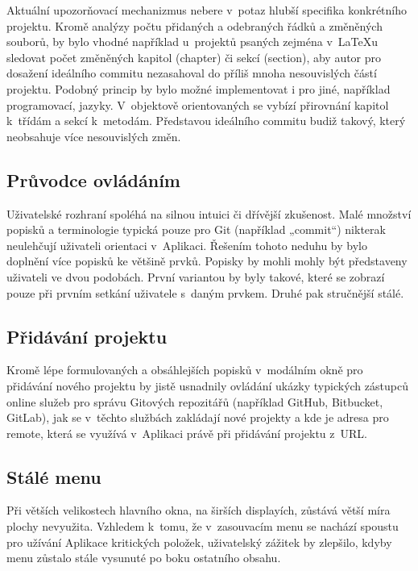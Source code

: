 Aktuální upozorňovací mechanizmus nebere v~potaz hlubší specifika konkrétního projektu. Kromě analýzy počtu přidaných a odebraných řádků a změněných souborů, by bylo vhodné například u~projektů psaných zejména v~\LaTeX{u} sledovat počet změněných kapitol (chapter) či sekcí (section), aby autor pro dosažení ideálního commitu nezasahoval do příliš mnoha nesouvislých částí projektu. Podobný princip by bylo možné implementovat i pro jiné, například programovací, jazyky. V~objektově orientovaných se vybízí přirovnání kapitol k~třídám a sekcí k~metodám. Představou ideálního commitu budiž takový, který neobsahuje více nesouvislých změn.

\subsection{Průvodce ovládáním}

Uživatelské rozhraní spoléhá na silnou intuici či dřívější zkušenost. Malé množství popisků a terminologie typická pouze pro Git (například „commit“) nikterak neulehčují uživateli orientaci v~Aplikaci. Řešením tohoto neduhu by bylo doplnění více popisků ke většině prvků. Popisky by mohli mohly být představeny uživateli ve dvou podobách. První variantou by byly takové, které se zobrazí pouze při prvním setkání uživatele s~daným prvkem. Druhé pak stručnější stálé.

\subsection{Přidávání projektu}

Kromě lépe formulovaných a obsáhlejších popisků v~modálním okně pro přidávání nového projektu by jistě usnadnily ovládání ukázky typických zástupců online služeb pro správu Gitových repozitářů (například GitHub, Bitbucket, GitLab), jak se v~těchto službách zakládají nové projekty a kde je adresa pro remote, která se využívá v~Aplikaci právě při přidávání projektu z~URL.

\subsection{Stálé menu}

Při větších velikostech hlavního okna, na širších displayích, zůstává větší míra plochy nevyužita. Vzhledem k~tomu, že v~zasouvacím menu se nachází spoustu pro užívání Aplikace kritických položek, uživatelský zážitek by zlepšilo, kdyby menu zůstalo stále vysunuté po boku ostatního obsahu.


